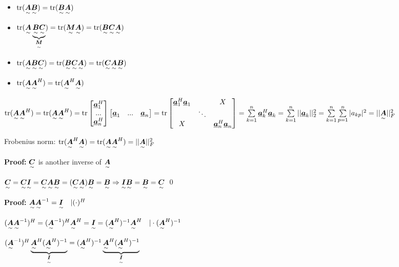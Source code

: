 \begin{itemize}
\item $\tr(\ma{A}\ma{B})=\tr(\ma{B}\ma{A})$
\item $\tr(\ma{A}\underbrace{\ma{B}\ma{C}}_{\ma{M}})=\tr(\ma{M}\ma{A})=\tr(\ma{B}\ma{C}\ma{A})$
\item $\tr(\ma{A}\ma{B}\ma{C})=\tr(\ma{B}\ma{C}\ma{A})=\tr(\ma{C}\ma{A}\ma{B})$
\item $\tr(\ma{A}\ma{A}^H)=\tr(\ma{A}^H\ma{A})$
\end{itemize}
$\tr(\ma{A}\ma{A}^H)=\tr(\ma{A}\ma{A}^H)=
\tr\begin{bmatrix}\vec{a}_1^H\\...\\\vec{a}_n^H\end{bmatrix}\begin{bmatrix}\vec{a}_1&...&\vec{a}_n\end{bmatrix}
=\tr\begin{bmatrix}\vec{a}_1^H\vec{a}_1 & & X\\ &\ddots& \\X& &\vec{a}_n^H\vec{a}_n\end{bmatrix}
=\sum\limits_{k=1}^n\vec{a}_k^H\vec{a}_k=\sum\limits_{k=1}^n||\vec{a}_k||^2_2
=\sum\limits_{k=1}^n\sum\limits_{p=1}^n|a_{kp}|^2=||\ma{A}||^2_F$

Frobenius norm: $\tr(\ma{A}^H\ma{A})=\tr(\ma{A}\ma{A}^H)=||\ma{A}||^2_F$



\textbf{Proof:} $\ma{C}$ is another inverse of $\ma{A}$

$\ma{C}=\ma{C}\ma{I}=\ma{C}\ma{A}\ma{B}=(\ma{C}\ma{A})\ma{B}=\ma{B}
\Rightarrow \ma{I}\ma{B}=\ma{B}=\ma{C}$ \qed


\textbf{Proof:} $\ma{A}\ma{A}^{-1}=\ma{I}\quad |(\cdot)^H$

$(\ma{A}\ma{A}^{-1})^H=(\ma{A}^{-1})^H\ma{A}^H=\ma{I}=(\ma{A}^H)^{-1}\ma{A}^H\quad|\cdot (\ma{A}^H)^{-1}$

$(\ma{A}^{-1})^H\underbrace{\ma{A}^H(\ma{A}^H)^{-1}}_{\ma{I}}
=(\ma{A}^H)^{-1}\underbrace{\ma{A}^H(\ma{A}^H)^{-1}}_{\ma{I}}$

